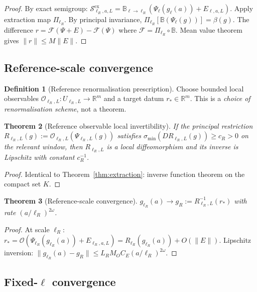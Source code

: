 \documentclass[12pt]{article}
\theoremstyle{plain}
\newtheorem{theorem}{Theorem}[section]
\theoremstyle{definition}
\newtheorem{definition}[theorem]{Definition}
\numberwithin{equation}{section}
\newcommand{\R}{\mathbb{R}}
\newcommand{\ex}{\mathrm{ex}}
\begin{document}
\begin{proof}
By exact semigroup: $\mathcal{S}^{\ex}_{\ell_R,a,L}=\mathbb{B}_{\ell\to\ell_R}(\Psi_\ell(g_\ell(a))+E_{\ell,a,L})$.  Apply extraction map $\Pi_{\ell_R}$.  By principal invariance, $\Pi_{\ell_R}[\mathbb{B}(\Psi_\ell(g))]=\beta(g)$.  The difference $r=\mathcal{F}(\Psi+E)-\mathcal{F}(\Psi)$ where $\mathcal{F}=\Pi_{\ell_R}\circ\mathbb{B}$.  Mean value theorem gives $\|r\|\leq M\|E\|$.
\end{proof}

\subsection{Reference-scale convergence}

\begin{definition}[Reference renormalisation prescription]\label{def:refprescription}
Choose bounded local observables $\mathcal{O}_{\ell_R,L}:U_{\ell_R,L}\to\R^m$ and a target datum $r_*\in\R^m$.  This is a \emph{choice of renormalisation scheme}, not a theorem.
\end{definition}

\begin{theorem}[Reference observable local invertibility]\label{thm:refinvert}
If the principal restriction $R_{\ell_R,L}(g):=\mathcal{O}_{\ell_R,L}(\Psi_{\ell_R,L}(g))$ satisfies $\sigma_{\min}(DR_{\ell_R,L}(g))\geq c_R>0$ on the relevant window, then $R_{\ell_R,L}$ is a local diffeomorphism and its inverse is Lipschitz with constant $c_R^{-1}$.
\end{theorem}

\begin{proof}
Identical to Theorem~\ref{thm:extraction}: inverse function theorem on the compact set $K$.
\end{proof}

\begin{theorem}[Reference-scale convergence]\label{thm:refscaleconv}
$g_{\ell_R}(a)\to g_R:=R_{\ell_R,L}^{-1}(r_*)$ with rate $(a/\ell_R)^{2\omega}$.
\end{theorem}

\begin{proof}
At scale $\ell_R$: $r_*=\mathcal{O}(\Psi_{\ell_R}(g_{\ell_R}(a))+E_{\ell_R,a,L})=R_{\ell_R}(g_{\ell_R}(a))+O(\|E\|)$.  Lipschitz inversion: $\|g_{\ell_R}(a)-g_R\|\leq L_R M_O C_E(a/\ell_R)^{2\omega}$.
\end{proof}

\subsection{Fixed-$\ell$ convergence}
\end{document}
